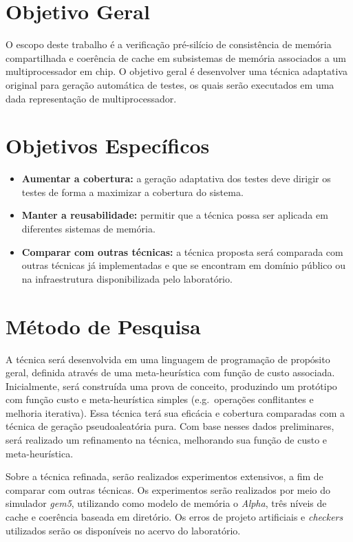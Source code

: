 \documentclass{ufsc-thesis} %
\begin{document}
\section{Objetivo Geral}
O escopo deste trabalho é a verificação pré-silício de consistência de memória
compartilhada e coerência de cache em subsistemas de memória associados a um
multiprocessador em chip. O objetivo geral é desenvolver uma técnica adaptativa
original para geração automática de testes, os quais serão executados em uma
dada representação de multiprocessador.

\section{Objetivos Específicos}
\begin{itemize}
    \item \textbf{Aumentar a cobertura:} a geração adaptativa dos testes deve
        dirigir os testes de forma a maximizar a cobertura do sistema.
    \item \textbf{Manter a reusabilidade:} permitir que a técnica possa ser
        aplicada em diferentes sistemas de memória.
    \item \textbf{Comparar com outras técnicas:} a técnica proposta será
        comparada com outras técnicas já implementadas e que se encontram em
        domínio público ou na infraestrutura disponibilizada pelo laboratório.
\end{itemize}

\section{Método de Pesquisa}

A técnica será desenvolvida em uma linguagem de programação de propósito geral,
definida através de uma meta-heurística com função de custo associada.
Inicialmente, será construída uma prova de conceito, produzindo um protótipo
com função custo e meta-heurística simples (e.g.\  operações conflitantes e
melhoria iterativa). Essa técnica terá sua eficácia e cobertura comparadas com
a técnica de geração pseudoaleatória pura. Com base nesses dados preliminares,
será realizado um refinamento na técnica, melhorando sua função de custo e
meta-heurística.

Sobre a técnica refinada, serão realizados experimentos extensivos, a fim de
comparar com outras técnicas. Os experimentos serão realizados por meio do
simulador \textit{gem5}, utilizando como modelo de memória o \textit{Alpha},
três níveis de cache e coerência baseada em diretório. Os erros de projeto
artificiais e \textit{checkers} utilizados serão os disponíveis no acervo do
laboratório.
\end{document}
